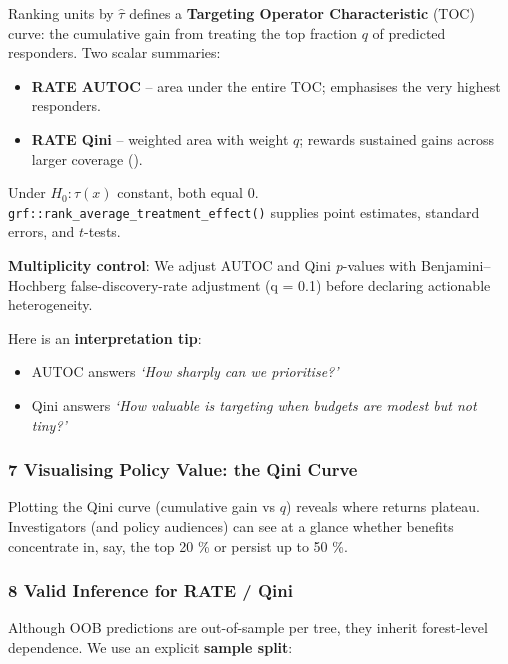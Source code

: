 \documentclass[
  single column]{article}
\providecommand{\tightlist}{%
  \setlength{\itemsep}{0pt}\setlength{\parskip}{0pt}}
\begin{document}
Ranking units by \(\widehat{\tau}\) defines a \textbf{Targeting Operator
Characteristic} (TOC) curve: the cumulative gain from treating the top
fraction \(q\) of predicted responders. Two scalar summaries:

\begin{itemize}
\tightlist
\item
  \textbf{RATE AUTOC} -- area under the entire TOC; emphasises the very
  highest responders.
\item
  \textbf{RATE Qini} -- weighted area with weight \(q\); rewards
  sustained gains across larger coverage
  ().
\end{itemize}

Under \(H_0{:}\tau(x)\) constant, both equal 0.
\texttt{grf::rank\_average\_treatment\_effect()} supplies point
estimates, standard errors, and \(t\)-tests.

\textbf{Multiplicity control}: We adjust AUTOC and Qini \emph{p}-values
with Benjamini--Hochberg false-discovery-rate adjustment (q = 0.1)
before declaring actionable heterogeneity.

Here is an \textbf{interpretation tip}:

\begin{itemize}
\tightlist
\item
  AUTOC answers \emph{`How sharply can we prioritise?'}
\item
  Qini answers \emph{`How valuable is targeting when budgets are modest
  but not tiny?'}
\end{itemize}

\subsubsection{7 Visualising Policy Value: the Qini
Curve}\label{visualising-policy-value-the-qini-curve}

Plotting the Qini curve (cumulative gain vs \(q\)) reveals where returns
plateau. Investigators (and policy audiences) can see at a glance
whether benefits concentrate in, say, the top 20 \% or persist up to 50
\%.

\subsubsection{8 Valid Inference for RATE /
Qini}\label{valid-inference-for-rate-qini}

Although OOB predictions are out-of-sample per tree, they inherit
forest-level dependence. We use an explicit \textbf{sample split}:
\end{document}
